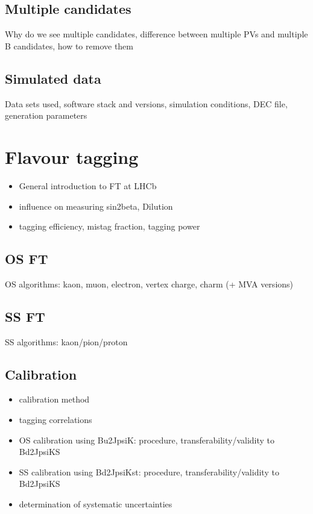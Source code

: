 \subsection{Multiple candidates}
Why do we see multiple candidates, difference between multiple PVs and multiple B candidates, how to remove them

\subsection{Simulated data}
Data sets used, software stack and versions, simulation conditions, DEC file, generation parameters

\section{Flavour tagging}
\begin{itemize}
  \item General introduction to FT at LHCb
  \item influence on measuring sin2beta, Dilution
  \item tagging efficiency, mistag fraction, tagging power
\end{itemize}

\subsection{OS FT}
OS algorithms: kaon, muon, electron, vertex charge, charm (+ MVA versions)

\subsection{SS FT}
SS algorithms: kaon/pion/proton

\subsection{Calibration}
\begin{itemize}
  \item calibration method
  \item tagging correlations
  \item OS calibration using Bu2JpsiK: procedure, transferability/validity to Bd2JpsiKS
  \item SS calibration using Bd2JpsiKst: procedure, transferability/validity to Bd2JpsiKS
  \item determination of systematic uncertainties
\end{itemize}

